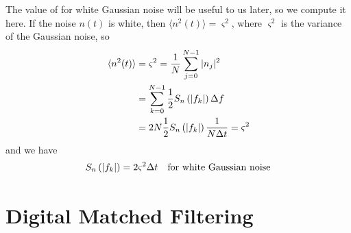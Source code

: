 The value of \ospsd for white Gaussian noise will be useful to us later, so we
compute it here. If the noise $n(t)$ is white, then $\langle n^2(t) \rangle =
\varsigma^2$, where $\varsigma^2$ is the variance of the Gaussian noise, so
\begin{equation}
\begin{split}
\langle n^2(t) \rangle &= \varsigma^2 = \frac{1}{N} \sum_{j=0}^{N-1} |n_j|^2 \\
&= \sum_{k=0}^{N-1} \frac{1}{2} S_n\left(\left|f_{k}\right|\right) \Delta f \\
&= 2N \frac{1}{2} S_n\left(\left|f_{k}\right|\right) \frac{1}{N\Delta t} = \varsigma^2
\end{split}
\end{equation}
and we have
\begin{equation}
S_n\left(\left|f_{k}\right|\right) = 2\varsigma^2\Delta t \quad\text{for white Gaussian noise}
\end{equation}

\section{Digital Matched Filtering}
\label{s:matchedfilter}

